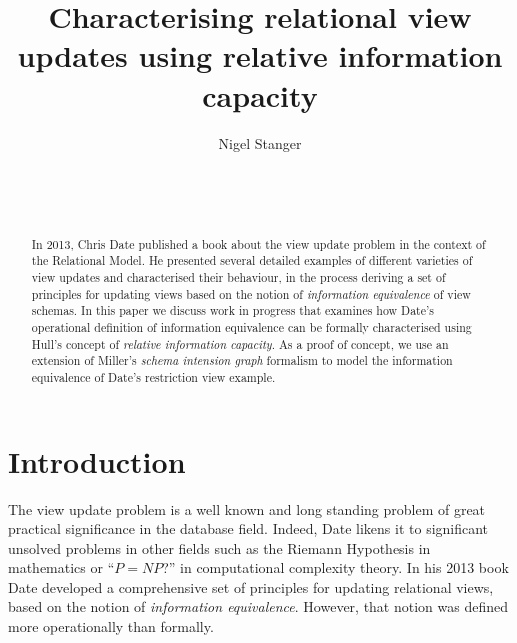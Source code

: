 \documentclass{sig-alternate-05-2015}
\begin{document}

\title{Characterising relational view updates using relative information capacity}

\author{
\alignauthor Nigel Stanger \\
    \\
    \\
    \\
}

\maketitle




\begin{abstract}
In 2013, Chris Date published a book about the view update problem in the context of the Relational Model. He presented several detailed examples of different varieties of view updates and characterised their behaviour, in the process deriving a set of principles for updating views based on the notion of \emph{information equivalence} of view schemas. In this paper we discuss work in progress that examines how Date's operational definition of information equivalence can be formally characterised using Hull's concept of \emph{relative information capacity}. As a proof of concept, we use an extension of Miller's \emph{schema intension graph} formalism to model the information equivalence of Date's restriction view example.
\end{abstract}








\section{Introduction}

\noindent The view update problem is a well known and long standing problem of great practical significance in the database field. Indeed, Date \cite{Date.C-2013a-View} likens it to significant unsolved problems in other fields such as the Riemann Hypothesis in mathematics or ``\(P = \mathit{NP}\)?'' in computational complexity theory. In his 2013 book \cite{Date.C-2013a-View} Date developed a comprehensive set of principles for updating relational views, based on the notion of \emph{information equivalence}. However, that notion was defined more operationally than formally.
\end{document}
